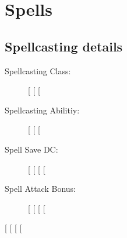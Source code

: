 \section*{Spells}

\subsection*{Spellcasting details}

\begin{description}
  \item [Spellcasting Class:]
[%
[%
[%
  \item [Spellcasting Abilitiy:]
[%
[%
[%
  \item [Spell Save DC:]
[%
[%
[%
[%
  \item [Spell Attack Bonus:]
[%
[%
[%
[%
\end{description}
[%
[%
  [%
    [%
